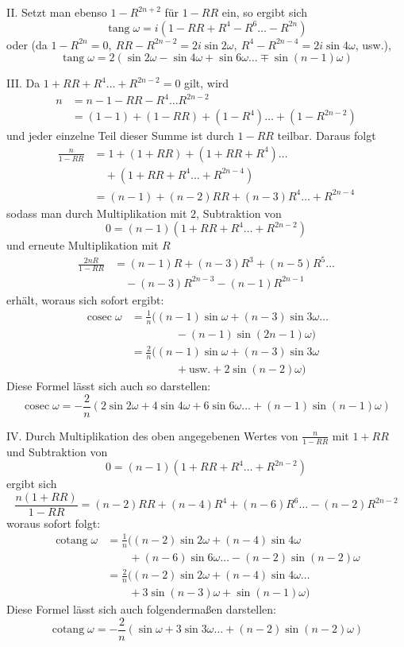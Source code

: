 II. Setzt man ebenso \(1-R^{2n+2}\) für \(1-RR\) ein, so ergibt sich
\[\operatorname{tang}\omega=i(1-RR+R^4-R^6\ldots-R^{2n})\] oder (da \(1-R^{2n}=0,\allowbreak \ RR-R^{2n-2}=2i\sin2\omega,\allowbreak \ R^4-R^{2n-4}=2i\sin4\omega\), usw.), \[\operatorname{tang}\omega=2(\sin2\omega-\sin4\omega+\sin6\omega\ldots\mp\sin(n-1)\omega)\]

III. Da \(1+RR+R^4\ldots+R^{2n-2}=0\) gilt, wird \[\begin{aligned}n&=n-1-RR-R^4\ldots R^{2n-2}\\&=(1-1)+(1-RR)+(1-R^4)\ldots+(1-R^{2n-2})\end{aligned}\] und jeder einzelne Teil dieser Summe ist durch \(1-RR\) teilbar. Daraus folgt \[\begin{aligned}\frac n{1-RR}&=1+(1+RR)+(1+RR+R^4)\ldots\\&\quad+(1+RR+R^4\ldots+R^{2n-4})\\&=(n-1)+(n-2)RR+(n-3)R^4\ldots+R^{2n-4}\end{aligned}\] sodass man durch Multiplikation mit \(2\), Subtraktion von \[0=(n-1)(1+RR+R^4\ldots+R^{2n-2})\] und erneute Multiplikation mit \(R\) \[\begin{aligned}\frac{2nR}{1-RR}&=(n-1)R+(n-3)R^3+(n-5)R^5\ldots\\&\quad-(n-3)R^{2n-3}-(n-1)R^{2n-1}\end{aligned}\] erhält, woraus sich sofort ergibt: \[\begin{aligned}\operatorname{cosec}\omega&=\frac1n\bigl((n-1)\sin\omega+(n-3)\sin3\omega\ldots\\&\qquad\qquad-(n-1)\sin(2n-1)\omega\bigr)\\&=\frac2n\bigl((n-1)\sin\omega+(n-3)\sin3\omega\\&\qquad\qquad+\text{usw.}+2\sin(n-2)\omega\bigr)\end{aligned}\] Diese Formel lässt sich auch so darstellen: \[\operatorname{cosec}\omega=-\frac2n(2\sin2\omega+4\sin4\omega+6\sin6\omega\ldots+(n-1)\sin(n-1)\omega)\]

IV. Durch Multiplikation des oben angegebenen Wertes von \(\frac n{1-RR}\) mit \(1+RR\) und Subtraktion von \[0=(n-1)(1+RR+R^4\ldots+R^{2n-2})\] ergibt sich \[\frac{n(1+RR)}{1-RR}=(n-2)RR+(n-4)R^4+(n-6)R^6\ldots-(n-2)R^{2n-2}\]
woraus sofort folgt: \[\begin{aligned}\operatorname{cotang}\omega&=\frac1n\bigl((n-2)\sin2\omega+(n-4)\sin4\omega\\&\qquad+(n-6)\sin6\omega\ldots-(n-2)\sin(n-2)\omega\\&=\frac2n((n-2)\sin2\omega+(n-4)\sin4\omega\ldots\\&\qquad+3\sin(n-3)\omega+\sin(n-1)\omega)\end{aligned}\] Diese Formel lässt sich auch folgendermaßen darstellen: \[\operatorname{cotang}\omega=-\frac2n(\sin\omega+3\sin3\omega\ldots+(n-2)\sin(n-2)\omega)\]\endgroup


